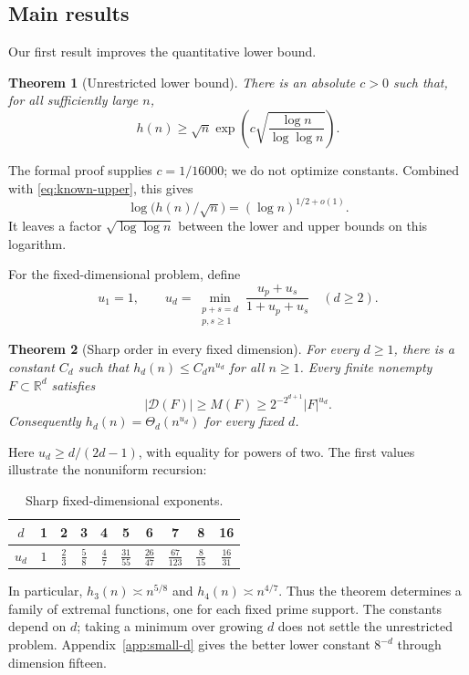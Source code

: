 \documentclass[11pt]{amsart}
\newtheorem{theorem}{Theorem}[section]
\theoremstyle{definition}
\theoremstyle{remark}
\newcommand{\R}{\mathbb{R}}
\newcommand{\Dp}{\mathcal{D}}
\begin{document}
\subsection*{Main results}
Our first result improves the quantitative lower bound.

\begin{theorem}[Unrestricted lower bound]\label{thm:main}
There is an absolute $c>0$ such that, for all sufficiently large $n$,
\[
h(n)\ge\sqrt n\exp\!\left(c\sqrt{\frac{\log n}{\log\log n}}\right).
\]
\end{theorem}

The formal proof supplies $c=1/16000$; we do not optimize constants. Combined with \eqref{eq:known-upper}, this gives
\[
\log\big(h(n)/\sqrt n\big)=(\log n)^{1/2+o(1)}.
\]
It leaves a factor $\sqrt{\log\log n}$ between the lower and upper bounds on this logarithm.

For the fixed-dimensional problem, define
\begin{equation}\label{eq:ud}
u_1=1,\qquad
u_d=\min_{\substack{p+s=d\\p,s\ge1}}
\frac{u_p+u_s}{1+u_p+u_s}\quad(d\ge2).
\end{equation}

\begin{theorem}[Sharp order in every fixed dimension]\label{thm:fixed}
For every $d\ge1$, there is a constant $C_d$ such that $h_d(n)\le C_dn^{u_d}$ for all $n\ge1$. Every finite nonempty $F\subset\R^d$ satisfies
\[
|\Dp(F)|\ge M(F)\ge 2^{-2^{d+1}}|F|^{u_d}.
\]
Consequently $h_d(n)=\Theta_d(n^{u_d})$ for every fixed $d$.
\end{theorem}

Here $u_d\ge d/(2d-1)$, with equality for powers of two. The first values illustrate the nonuniform recursion:
\begin{table}[ht]
\centering
\begin{tabular}{@{}c|ccccccccc@{}}
\toprule
$d$ & 1 & 2 & 3 & 4 & 5 & 6 & 7 & 8 & 16\\
\midrule
$u_d$ & $1$ & $\frac23$ & $\frac58$ & $\frac47$ & $\frac{31}{55}$ & $\frac{26}{47}$ & $\frac{67}{123}$ & $\frac8{15}$ & $\frac{16}{31}$\\
\bottomrule
\end{tabular}
\caption{Sharp fixed-dimensional exponents.}\label{tab:ud}
\end{table}
In particular, $h_3(n)\asymp n^{5/8}$ and $h_4(n)\asymp n^{4/7}$. Thus the theorem determines a family of extremal functions, one for each fixed prime support. The constants depend on $d$; taking a minimum over growing $d$ does not settle the unrestricted problem. Appendix~\ref{app:small-d} gives the better lower constant $8^{-d}$ through dimension fifteen.
\end{document}
